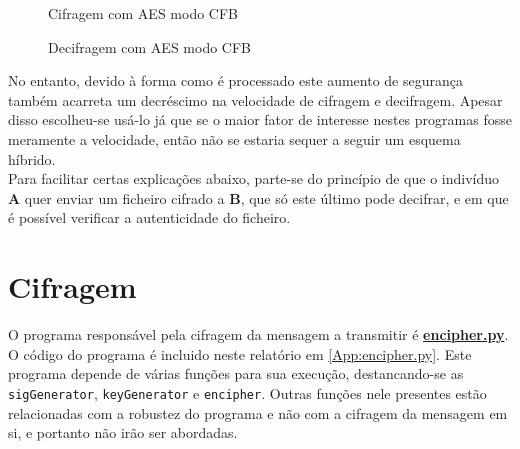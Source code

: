 \documentclass[a4paper,11pt,openright,oneside]{report}
\begin{document}
\begin{figure}[ht]
\center
{}
\caption{Cifragem com AES modo CFB}
\label{fig:crypto6}
\end{figure}

\begin{figure}[ht]
\center
{}
\caption{Decifragem com AES modo CFB}
\label{fig:crypto7}
\end{figure}

No entanto, devido à forma como é processado este aumento de segurança também acarreta um decréscimo na velocidade de cifragem e decifragem. Apesar disso escolheu-se usá-lo já que se o maior fator de interesse nestes programas fosse meramente a velocidade, então não se estaria sequer a seguir um esquema híbrido.\\

Para facilitar certas explicações abaixo, parte-se do princípio de que o indivíduo \textbf{A} quer enviar um ficheiro cifrado a \textbf{B}, que só este último pode decifrar, e em que é possível verificar a autenticidade do ficheiro.

\section{Cifragem}

O programa responsável pela cifragem da mensagem a transmitir é \href{run:../Python/Sender/encipher.py}{\textbf{encipher.py}}. O código do programa é incluido neste relatório em \ref{App:encipher.py}.
Este programa depende de várias funções para sua execução, destancando-se as \verb|sigGenerator|, \verb|keyGenerator| e \verb|encipher|. Outras funções nele presentes estão relacionadas com a robustez do programa e não com a cifragem da mensagem em si, e portanto não irão ser abordadas.\\
\end{document}
